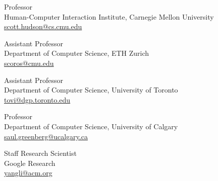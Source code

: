  {
	 {
		Professor\\
		Human-Computer Interaction Institute, Carnegie Mellon University\\
		\url{scott.hudson@cs.cmu.edu}
	}
}

 {
	 {
		Assistant Professor\\
		Department of Computer Science, ETH Zurich\\
		\url{scoros@cmu.edu}
	}
}


 {
	 {
		Assistant Professor\\
		Department of Computer Science, University of Toronto\\
		\url{tovi@dgp.toronto.edu}
	}
}

 {
	 {
		Professor\\
		Department of Computer Science, University of Calgary\\
		\url{saul.greenberg@ucalgary.ca}
	}
}

 {
	 {
		Staff Research Scientist\\
		Google Research\\
		\url{yangli@acm.org}
	}
}